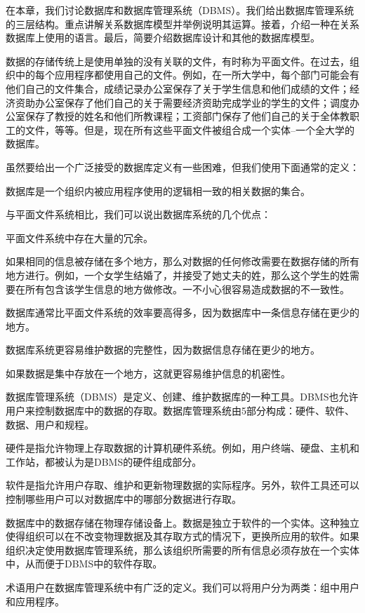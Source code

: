 
在本章，我们讨论数据库和数据库管理系统（DBMS）。我们给出数据库管理系统的三层结构。重点讲解关系数据库模型并举例说明其运算。接着，介绍一种在关系数据库上使用的语言。最后，简要介绍数据库设计和其他的数据库模型。\par
数据的存储传统上是使用单独的没有关联的文件，有时称为平面文件。在过去，组织中的每个应用程序都使用自己的文件。例如，在一所大学中，每个部门可能会有他们自己的文件集合，成绩记录办公室保存了关于学生信息和他们成绩的文件；经济资助办公室保存了他们自己的关于需要经济资助完成学业的学生的文件；调度办公室保存了教授的姓名和他们所教课程；工资部门保存了他们自己的关于全体教职工的文件，等等。但是，现在所有这些平面文件被组合成一个实体--一个全大学的数据库。\par
虽然要给出一个广泛接受的数据库定义有一些困难，但我们使用下面通常的定义：\par
数据库是一个组织内被应用程序使用的逻辑相一致的相关数据的集合。\par
与平面文件系统相比，我们可以说出数据库系统的几个优点：\par
平面文件系统中存在大量的冗余。\par
如果相同的信息被存储在多个地方，那么对数据的任何修改需要在数据存储的所有地方进行。例如，一个女学生结婚了，并接受了她丈夫的姓，那么这个学生的姓需要在所有包含该学生信息的地方做修改。一不小心很容易造成数据的不一致性。\par
数据库通常比平面文件系统的效率要高得多，因为数据库中一条信息存储在更少的地方。\par
数据库系统更容易维护数据的完整性，因为数据信息存储在更少的地方。\par
如果数据是集中存放在一个地方，这就更容易维护信息的机密性。\par
数据库管理系统（DBMS）是定义、创建、维护数据库的一种工具。DBMS也允许用户来控制数据库中的数据的存取。数据库管理系统由5部分构成：硬件、软件、数据、用户和规程。\par
硬件是指允许物理上存取数据的计算机硬件系统。例如，用户终端、硬盘、主机和工作站，都被认为是DBMS的硬件组成部分。\par
软件是指允许用户存取、维护和更新物理数据的实际程序。另外，软件工具还可以控制哪些用户可以对数据库中的哪部分数据进行存取。\par
数据库中的数据存储在物理存储设备上。数据是独立于软件的一个实体。这种独立使得组织可以在不改变物理数据及其存取方式的情况下，更换所应用的软件。如果组织决定使用数据库管理系统，那么该组织所需要的所有信息必须存放在一个实体中，从而便于DBMS中的软件存取。\par
术语用户在数据库管理系统中有广泛的定义。我们可以将用户分为两类：组中用户和应用程序。\par
